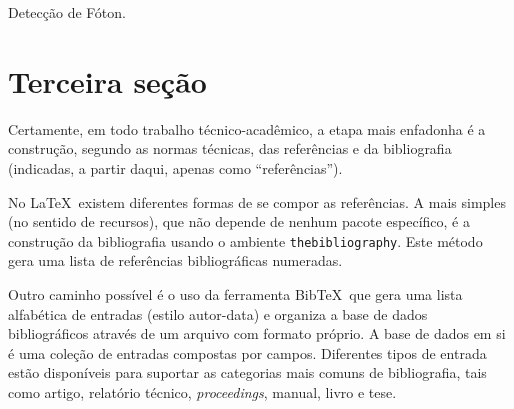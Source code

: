 \documentclass[a4paper,12pt,oneside,onecolumn]{uerj/uerj}
\newcommand{\BibTeX}{{{Bib}}\TeX}
\begin{document}
\begin{algorithm*}[!ht]
    \caption{Detecção de Fóton.}
    \begin{pseudocode*}
        \Continuacao
        \Algoritmo{}
                \FimSe
            \Senao
            \FimSe
        \Senao
        \FimSe
        \FimAlgoritmo
      \FimDocumentacao
    \end{pseudocode*}
\end{algorithm*}

\section{Terceira seção}

Certamente, em todo trabalho técnico-acadêmico, a etapa mais enfadonha é a construção, segundo as normas técnicas, das referências e da bibliografia (indicadas, a partir daqui, apenas como ``referências'').

No \LaTeX\ existem diferentes formas de se compor as referências. A mais simples (no sentido de recursos), que não depende de nenhum pacote específico, é a construção da bibliografia usando o ambiente \texttt{thebiblio\-graphy}. Este método gera uma lista de referências bibliográficas numeradas.

Outro caminho possível é o uso da ferramenta \BibTeX\ que gera uma lista alfabética de entradas (estilo autor-data) e organiza a base de dados bibliográficos através de um arquivo com formato próprio. A base de dados em si é uma coleção de entradas compostas por campos. Diferentes tipos de entrada estão disponíveis para suportar as categorias mais comuns de bibliografia, tais como artigo, relatório técnico, \textsl{proceedings}, manual, livro e tese. 
\end{document}
